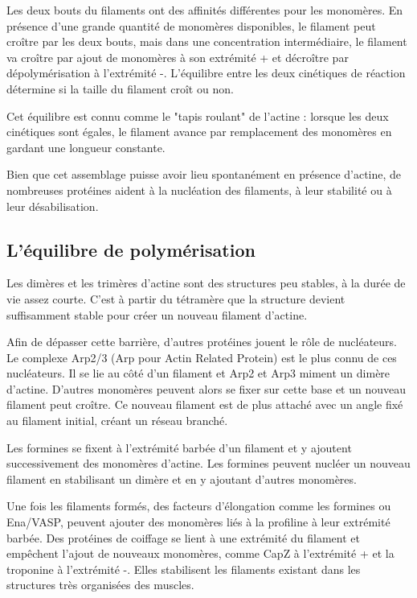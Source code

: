 \documentclass{report}
\begin{document}
Les deux bouts du filaments ont des affinités différentes pour les monomères. En présence d'une grande quantité de monomères disponibles, le filament peut croître par les deux bouts, mais dans une concentration intermédiaire, le filament va croître par ajout de monomères à son extrémité + et décroître par dépolymérisation à l'extrémité -. L'équilibre entre les deux cinétiques de réaction détermine si la taille du filament croît ou non. 

Cet équilibre est connu comme le "tapis roulant" de l'actine : lorsque les deux cinétiques sont égales, le filament avance par remplacement des monomères en gardant une longueur constante. 

Bien que cet assemblage puisse avoir lieu spontanément en présence d'actine, de nombreuses protéines aident à la nucléation des filaments, à leur stabilité ou à leur désabilisation. 

\subsection{L'équilibre de polymérisation}

Les dimères et les trimères d'actine sont des structures peu stables, à la durée de vie assez courte. C'est à partir du tétramère que la structure devient suffisamment stable pour créer un nouveau filament d'actine. 

Afin de dépasser cette barrière, d'autres protéines jouent le rôle de nucléateurs. Le complexe Arp2/3 (Arp pour Actin Related Protein) est le plus connu de ces nucléateurs. Il se lie au côté d'un filament et Arp2 et Arp3 miment un dimère d'actine. D'autres monomères peuvent alors se fixer sur cette base et un nouveau filament peut croître. Ce nouveau filament est de plus attaché avec un angle fixé au filament initial, créant un réseau branché. 

Les formines se fixent à l'extrémité barbée d'un filament et y ajoutent successivement des monomères d'actine. Les formines peuvent nucléer un nouveau filament en stabilisant un dimère et en y ajoutant d'autres monomères. 


Une fois les filaments formés, des facteurs d'élongation comme les formines ou Ena/VASP, peuvent ajouter des monomères liés à la profiline à leur extrémité barbée.
Des protéines de coiffage se lient à une extrémité du filament et empêchent l'ajout de nouveaux monomères, comme CapZ à l'extrémité +  et la troponine à l'extrémité -. Elles stabilisent les filaments existant dans les structures très organisées des muscles. 
\end{document}
